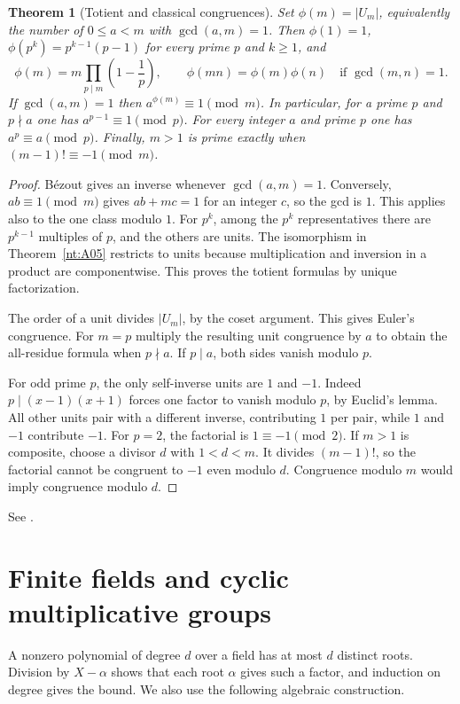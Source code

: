 \documentclass[11pt,oneside,openany]{book}
\theoremstyle{plain}
\newtheorem{theorem}{Theorem}[chapter]
\theoremstyle{definition}
\theoremstyle{remark}
\begin{document}
\begin{theorem}[Totient and classical congruences]\label{nt:B01}
Set $\phi(m)=|U_m|$, equivalently the number of $0\le a<m$
with $\gcd(a,m)=1$. Then $\phi(1)=1$, $\phi(p^k)=p^{k-1}(p-1)$
for every prime $p$ and $k\ge1$, and
\[
 \phi(m)=m\prod_{p\mid m}\left(1-\frac1p\right),\qquad
 \phi(mn)=\phi(m)\phi(n)\quad\text{if }\gcd(m,n)=1.
\]
If $\gcd(a,m)=1$ then $a^{\phi(m)}\equiv1\pmod m$. In particular,
for a prime $p$ and $p\nmid a$ one has $a^{p-1}\equiv1\pmod p$.
For every integer $a$ and prime $p$ one has $a^p\equiv a\pmod p$.
Finally, $m>1$ is prime exactly when $(m-1)!\equiv-1\pmod m$.
\end{theorem}
\begin{proof}
B\'ezout gives an inverse whenever $\gcd(a,m)=1$. Conversely,
$ab\equiv1\pmod m$ gives $ab+mc=1$ for an integer $c$, so the
gcd is $1$. This applies also to the one class modulo $1$.
For $p^k$, among the $p^k$ representatives there are $p^{k-1}$
multiples of $p$, and the others are units. The isomorphism in
Theorem~\ref{nt:A05} restricts to units because multiplication
and inversion in a product are componentwise. This proves the
totient formulas by unique factorization.

The order of a unit divides $|U_m|$, by the coset argument.
This gives Euler's congruence. For $m=p$ multiply the resulting
unit congruence by $a$ to obtain the all-residue formula when
$p\nmid a$. If $p\mid a$, both sides vanish modulo $p$.

For odd prime $p$, the only self-inverse units are $1$ and $-1$.
Indeed $p\mid(x-1)(x+1)$ forces one factor to vanish modulo
$p$, by Euclid's lemma. All other units pair with a different
inverse, contributing $1$ per pair, while $1$ and $-1$ contribute
$-1$. For $p=2$, the factorial is $1\equiv-1\pmod2$.
If $m>1$ is composite, choose a divisor $d$ with $1<d<m$.
It divides $(m-1)!$, so the factorial cannot be congruent to
$-1$ even modulo $d$. Congruence modulo $m$ would imply
congruence modulo $d$.
\end{proof}
See \cite[\S\S2.3--2.5 and Thms.~5.17, 5.19, 5.24]{apostol}.

\section{Finite fields and cyclic multiplicative groups}

A nonzero polynomial of degree $d$ over a field has at most
$d$ distinct roots. Division by $X-\alpha$ shows that each
root $\alpha$ gives such a factor, and induction on degree
gives the bound. We also use the following algebraic construction.
\end{document}
